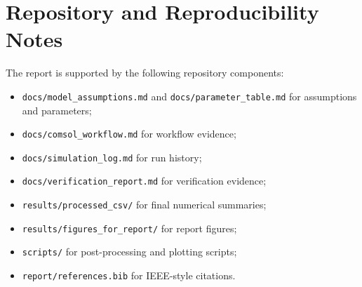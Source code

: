 ﻿\documentclass[12pt,a4paper,oneside]{report}
\begin{document}
\chapter{Repository and Reproducibility Notes}
The report is supported by the following repository components:
\begin{itemize}
    \item \texttt{docs/model\_assumptions.md} and \texttt{docs/parameter\_table.md} for assumptions and parameters;
    \item \texttt{docs/comsol\_workflow.md} for workflow evidence;
    \item \texttt{docs/simulation\_log.md} for run history;
    \item \texttt{docs/verification\_report.md} for verification evidence;
    \item \texttt{results/processed\_csv/} for final numerical summaries;
    \item \texttt{results/figures\_for\_report/} for report figures;
    \item \texttt{scripts/} for post-processing and plotting scripts;
    \item \texttt{report/references.bib} for IEEE-style citations.
\end{itemize}



\end{document}
